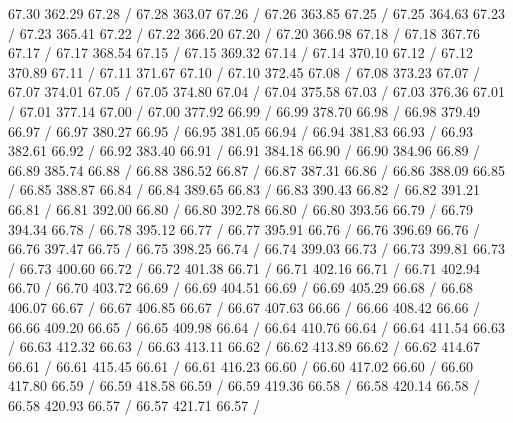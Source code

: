 { 67.30 362.29 67.28 /
 67.28 363.07 67.26 /
 67.26 363.85 67.25 /
 67.25 364.63 67.23 /
 67.23 365.41 67.22 /
 67.22 366.20 67.20 /
 67.20 366.98 67.18 /
 67.18 367.76 67.17 /
 67.17 368.54 67.15 /
 67.15 369.32 67.14 /
 67.14 370.10 67.12 /
 67.12 370.89 67.11 /
 67.11 371.67 67.10 /
 67.10 372.45 67.08 /
 67.08 373.23 67.07 /
 67.07 374.01 67.05 /
 67.05 374.80 67.04 /
 67.04 375.58 67.03 /
 67.03 376.36 67.01 /
 67.01 377.14 67.00 /
 67.00 377.92 66.99 /
 66.99 378.70 66.98 /
 66.98 379.49 66.97 /
 66.97 380.27 66.95 /
 66.95 381.05 66.94 /
 66.94 381.83 66.93 /
 66.93 382.61 66.92 /
 66.92 383.40 66.91 /
 66.91 384.18 66.90 /
 66.90 384.96 66.89 /
 66.89 385.74 66.88 /
 66.88 386.52 66.87 /
 66.87 387.31 66.86 /
 66.86 388.09 66.85 /
 66.85 388.87 66.84 /
 66.84 389.65 66.83 /
 66.83 390.43 66.82 /
 66.82 391.21 66.81 /
 66.81 392.00 66.80 /
 66.80 392.78 66.80 /
 66.80 393.56 66.79 /
 66.79 394.34 66.78 /
 66.78 395.12 66.77 /
 66.77 395.91 66.76 /
 66.76 396.69 66.76 /
 66.76 397.47 66.75 /
 66.75 398.25 66.74 /
 66.74 399.03 66.73 /
 66.73 399.81 66.73 /
 66.73 400.60 66.72 /
 66.72 401.38 66.71 /
 66.71 402.16 66.71 /
 66.71 402.94 66.70 /
 66.70 403.72 66.69 /
 66.69 404.51 66.69 /
 66.69 405.29 66.68 /
 66.68 406.07 66.67 /
 66.67 406.85 66.67 /
 66.67 407.63 66.66 /
 66.66 408.42 66.66 /
 66.66 409.20 66.65 /
 66.65 409.98 66.64 /
 66.64 410.76 66.64 /
 66.64 411.54 66.63 /
 66.63 412.32 66.63 /
 66.63 413.11 66.62 /
 66.62 413.89 66.62 /
 66.62 414.67 66.61 /
 66.61 415.45 66.61 /
 66.61 416.23 66.60 /
 66.60 417.02 66.60 /
 66.60 417.80 66.59 /
 66.59 418.58 66.59 /
 66.59 419.36 66.58 /
 66.58 420.14 66.58 /
 66.58 420.93 66.57 /
 66.57 421.71 66.57 /
}

